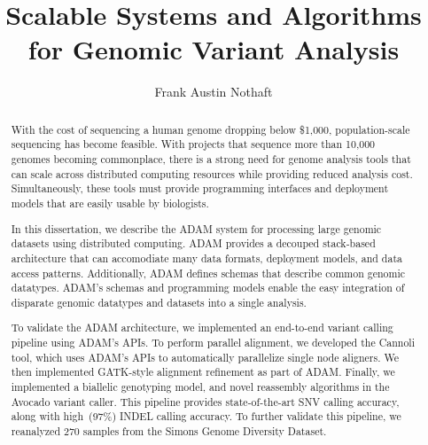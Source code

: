 \documentclass[phd]{ucbthesis}
\begin{document}
\frontmatter

\title{Scalable Systems and Algorithms for Genomic Variant Analysis}
\author{Frank Austin Nothaft}

\maketitle

\approvalpage
\copyrightpage

\begin{abstract}
  With the cost of sequencing a human genome dropping below \$1,000,
  population-scale sequencing has become feasible. With projects that sequence
  more than 10,000 genomes becoming commonplace, there is a strong need for
  genome analysis tools that can scale across distributed computing
  resources while providing reduced analysis cost. Simultaneously, these tools
  must provide programming interfaces and deployment models that are easily
  usable by biologists.

  In this dissertation, we describe the {ADAM} system for processing
  large genomic datasets using distributed computing. {ADAM} provides
  a decouped stack-based architecture that can accomodiate many data formats,
  deployment models, and data access patterns. Additionally, {ADAM}
  defines schemas that describe common genomic datatypes. {ADAM}'s
  schemas and programming models enable the easy integration of disparate
  genomic datatypes and datasets into a single analysis.

  To validate the {ADAM} architecture, we implemented an end-to-end
  variant calling pipeline using {ADAM}'s APIs. To perform parallel
  alignment, we developed the {Cannoli} tool, which uses {ADAM}'s
  APIs to automatically parallelize single node aligners. We then
  implemented {GATK}-style alignment refinement as part of {ADAM}.
  Finally, we implemented a biallelic genotyping model, and novel reassembly
  algorithms in the {Avocado} variant caller. This pipeline provides
  state-of-the-art SNV calling accuracy, along with high~(97\%) INDEL calling
  accuracy. To further validate this pipeline, we reanalyzed 270 samples from
  the Simons Genome Diversity Dataset.
\end{abstract}

\tableofcontents
\end{document}
